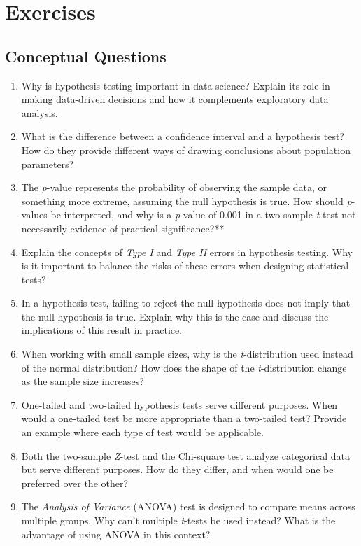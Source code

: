 \documentclass[
]{book}
\theoremstyle{definition}
\theoremstyle{definition}
\theoremstyle{definition}
\theoremstyle{definition}
\theoremstyle{remark}
\begin{document}
\section{Exercises}\label{exercises-3}

\subsection*{Conceptual Questions}\label{conceptual-questions-1}

\begin{enumerate}
\def\labelenumi{\arabic{enumi}.}
\item
  Why is hypothesis testing important in data science? Explain its role in making data-driven decisions and how it complements exploratory data analysis.
\item
  What is the difference between a confidence interval and a hypothesis test? How do they provide different ways of drawing conclusions about population parameters?
\item
  The \emph{p}-value represents the probability of observing the sample data, or something more extreme, assuming the null hypothesis is true. How should \emph{p}-values be interpreted, and why is a \emph{p}-value of 0.001 in a two-sample \emph{t}-test not necessarily evidence of practical significance?**
\item
  Explain the concepts of \emph{Type I} and \emph{Type II} errors in hypothesis testing. Why is it important to balance the risks of these errors when designing statistical tests?
\item
  In a hypothesis test, failing to reject the null hypothesis does not imply that the null hypothesis is true. Explain why this is the case and discuss the implications of this result in practice.
\item
  When working with small sample sizes, why is the \emph{t}-distribution used instead of the normal distribution? How does the shape of the \emph{t}-distribution change as the sample size increases?
\item
  One-tailed and two-tailed hypothesis tests serve different purposes. When would a one-tailed test be more appropriate than a two-tailed test? Provide an example where each type of test would be applicable.
\item
  Both the two-sample \emph{Z}-test and the Chi-square test analyze categorical data but serve different purposes. How do they differ, and when would one be preferred over the other?
\item
  The \emph{Analysis of Variance} (ANOVA) test is designed to compare means across multiple groups. Why can't multiple \emph{t}-tests be used instead? What is the advantage of using ANOVA in this context?
\end{enumerate}
\end{document}

